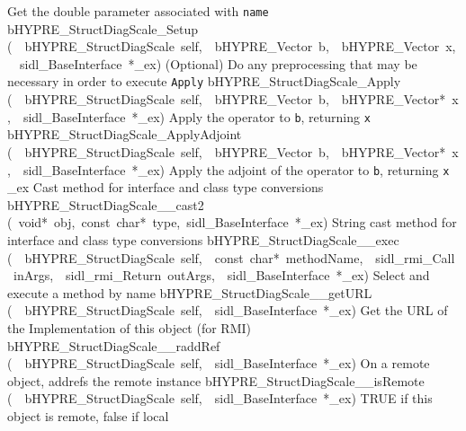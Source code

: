 \documentclass{article}
\begin{document}
\begin{cxxentry}
\begin{cxxentry}
\begin{cxxnames}
        {
Get the double parameter associated with {\tt name}}
        {}
\label{cxx.7.1.25}
        {bHYPRE\_StructDiagScale\_Setup}
        {(\ \ bHYPRE\_StructDiagScale\ self,\ \ bHYPRE\_Vector\ b,\ \ bHYPRE\_Vector\ x,\ \ sidl\_BaseInterface\ *\_ex)}
        {
(Optional) Do any preprocessing that may be necessary in
order to execute {\tt Apply}}
        {}
\label{cxx.7.1.26}
        {bHYPRE\_StructDiagScale\_Apply}
        {(\ \ bHYPRE\_StructDiagScale\ self,\ \ bHYPRE\_Vector\ b,\ \ bHYPRE\_Vector*\ x,\ \ sidl\_BaseInterface\ *\_ex)}
        {
Apply the operator to {\tt b}, returning {\tt x}}
        {}
\label{cxx.7.1.27}
        {bHYPRE\_StructDiagScale\_ApplyAdjoint}
        {(\ \ bHYPRE\_StructDiagScale\ self,\ \ bHYPRE\_Vector\ b,\ \ bHYPRE\_Vector*\ x,\ \ sidl\_BaseInterface\ *\_ex)}
        {
Apply the adjoint of the operator to {\tt b}, returning {\tt x}}
        {}
\label{cxx.7.1.28}
        {\_ex}
        {}
        {
Cast method for interface and class type conversions}
        {}
\label{cxx.7.1.29}
        {bHYPRE\_StructDiagScale\_\_cast2}
        {(\ void*\ obj,\ const\ char*\ type,\ sidl\_BaseInterface\ *\_ex)}
        {
String cast method for interface and class type conversions}
        {}
\label{cxx.7.1.30}
        {bHYPRE\_StructDiagScale\_\_exec}
        {(\ \ bHYPRE\_StructDiagScale\ self,\ \ const\ char*\ methodName,\ \ sidl\_rmi\_Call\ inArgs,\ \ sidl\_rmi\_Return\ outArgs,\ \ sidl\_BaseInterface\ *\_ex)}
        {
Select and execute a method by name}
        {}
\label{cxx.7.1.31}
        {bHYPRE\_StructDiagScale\_\_getURL}
        {(\ \ bHYPRE\_StructDiagScale\ self,\ \ sidl\_BaseInterface\ *\_ex)}
        {
Get the URL of the Implementation of this object (for RMI)}
        {}
\label{cxx.7.1.32}
        {bHYPRE\_StructDiagScale\_\_raddRef}
        {(\ \ bHYPRE\_StructDiagScale\ self,\ \ sidl\_BaseInterface\ *\_ex)}
        {
On a remote object, addrefs the remote instance}
        {}
\label{cxx.7.1.33}
        {bHYPRE\_StructDiagScale\_\_isRemote}
        {(\ \ bHYPRE\_StructDiagScale\ self,\ \ sidl\_BaseInterface\ *\_ex)}
        {
TRUE if this object is remote, false if local}

\end{cxxnames}
\end{cxxentry}
\end{cxxentry}
\end{document}

